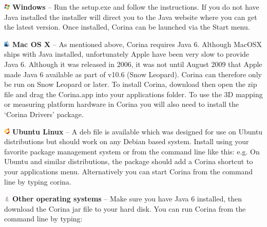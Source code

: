 \begin{description}
\item \includegraphics[width=3mm]{Images/windows.png} \textbf{Windows} -- Run the setup.exe and follow the instructions. If you do not have Java installed the installer will direct you to the Java website where you can get the latest version. Once installed, Corina can be launched via the Start menu.

\item \includegraphics[width=3mm]{Images/mac.png} \textbf{Mac OS X} -- As mentioned above, Corina requires Java 6. Although MacOSX ships with Java installed, unfortunately Apple have been very slow to provide Java 6. Although it was released in 2006, it was not until August 2009 that Apple made Java 6 available as part of v10.6 (Snow Leopard). Corina can therefore only be run on Snow Leopard or later. To install Corina, download then open the zip file and drag the Corina.app into your applications folder.  To use the 3D mapping or measuring platform hardware in Corina you will also need to install the `Corina Drivers' package.  

\item \includegraphics[width=3mm]{Images/ubuntu.png} \textbf{Ubuntu Linux} --  A deb file is available which was designed for use on Ubuntu distributions but should work on any Debian based system. Install using your favorite package management system or from the command line like this: e.g.  On Ubuntu and similar distributions, the package should add a Corina shortcut to your applications menu. Alternatively you can start Corina from the command line by typing corina.

\item \includegraphics[width=3mm]{Images/java.png} \textbf{Other operating systems} -- Make sure you have Java 6 installed, then download the Corina jar file to your hard disk. You can run Corina from the command line by typing: 
\end{description}

